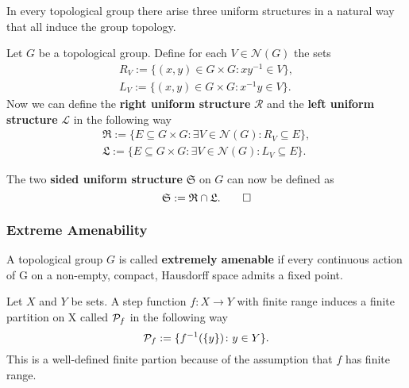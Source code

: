 In every topological group there arise three uniform structures in a natural way that all induce the group topology.

\begin{defin}
  Let $G$ be a topological group. Define for each $V \in \mathcal{N}(G)$ the sets
  \begin{align*}
    R_V := \{(x, y) \in G\times G\colon xy^{-1} \in V\}, \\
    L_V := \{(x, y) \in G\times G\colon x^{-1}y \in V\}.
  \end{align*}
  Now we can define the \textbf{right uniform structure} $\mathcal{R}$ and the \textbf{left uniform structure} $\mathcal{L}$ in the following way
  \begin{align*}
    \mathfrak{R} := \{ E \subseteq G\times G \colon \exists V \in \mathcal{N}(G)\colon R_V \subseteq E \}, \\
    \mathfrak{L} := \{ E \subseteq G\times G \colon \exists V \in \mathcal{N}(G)\colon L_V \subseteq E \}.
  \end{align*}

  The two \textbf{sided uniform structure} $\mathfrak{S}$ on $G$ can now be defined as
  \begin{equation*}
    \mathfrak{S}:= \mathfrak{R} \cap \mathfrak{L}.\qedhere
  \end{equation*}
\end{defin}

\subsubsection{Extreme Amenability}

\begin{defin}
  A topological group $G$ is called \textbf{extremely amenable} if every continuous action of G on a non-empty, compact, Hausdorff space admits a fixed point.
\end{defin}

\begin{defin}
  Let $X$ and $Y$ be sets. A step function $f\colon X \to Y$ with finite range induces a finite partition on X called $\P_f$ in the following way
  \begin{equation*}
    \P_f := \{f^{-1}(\{y\})\colon y \in Y\}.
  \end{equation*}
  This is a well-defined finite partion because of the assumption that $f$ has finite range.
\end{defin}


